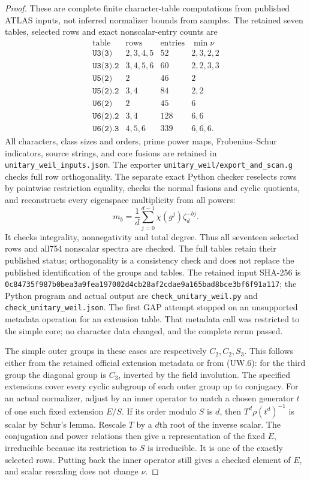 \begin{proof}
These are complete finite character-table computations from
published ATLAS inputs, not inferred normalizer bounds from
samples. The retained seven tables, selected rows and exact
nonscalar-entry counts are
\[
\begin{array}{c|c|c|c}
\text{table}&\text{rows}&\text{entries}&\min\nu\\\hline
\texttt{U3(3)}&2,3,4,5&52&2,3,2,2\\
\texttt{U3(3).2}&3,4,5,6&60&2,2,3,3\\
\texttt{U5(2)}&2&46&2\\
\texttt{U5(2).2}&3,4&84&2,2\\
\texttt{U6(2)}&2&45&6\\
\texttt{U6(2).2}&3,4&128&6,6\\
\texttt{U6(2).3}&4,5,6&339&6,6,6.
\end{array}                                                  \tag{UW.8}
\]
All characters, class sizes and orders, prime power maps,
Frobenius--Schur indicators, source strings, and core fusions
are retained in \texttt{unitary\_weil\_inputs.json}.
The exporter \texttt{unitary\_weil/export\_and\_scan.g}
checks full row orthogonality. The separate exact Python
checker reselects rows by pointwise restriction equality,
checks the normal fusions and cyclic quotients, and reconstructs
every eigenspace multiplicity from all powers:
\[
 m_b=\frac1d\sum_{j=0}^{d-1}\chi(g^j)\zeta_d^{-bj}.
                                                               \tag{UW.9}
\]
It checks integrality, nonnegativity and total degree. Thus
all seventeen selected rows and all754 nonscalar spectra
are checked. The full tables retain their published status;
orthogonality is a consistency check and does not replace
the published identification of the groups and tables.
The retained input SHA-256 is
\texttt{0c84735f987b0bea3a9fea197002d4cb28af2cdae9a165bad8bce3bf6f91a117};
the Python program and actual output are
\texttt{check\_unitary\_weil.py} and
\texttt{check\_unitary\_weil.json}. The first GAP attempt
stopped on an unsupported metadata operation for an extension
table. That metadata call was restricted to the simple core;
no character data changed, and the complete rerun passed.

The simple outer groups in these cases are respectively
$C_2,C_2,S_3$. This follows either from the retained official
extension metadata or from (UW.6): for the third group the
diagonal group is $C_3$, inverted by the field involution.
The specified extensions cover every cyclic subgroup of
each outer group up to conjugacy. For an actual normalizer,
adjust by an inner operator to match a chosen generator
$t$ of one such fixed extension $E/S$. If its order modulo
$S$ is $d$, then $T^d\rho(t^d)^{-1}$ is scalar by Schur's
lemma. Rescale $T$ by a $d$th root of the inverse scalar.
The conjugation and power relations then give a representation
of the fixed $E$, irreducible because its restriction to $S$
is irreducible. It is one of the exactly selected rows.
Putting back the inner operator still gives a checked element
of $E$, and scalar rescaling does not change $\nu$.


\end{proof}
